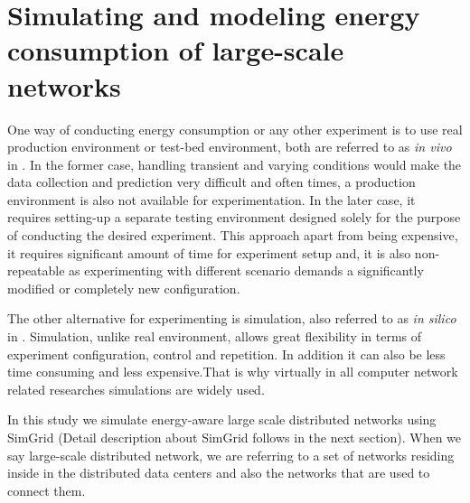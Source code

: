 \section{Simulating and modeling energy consumption of large-scale networks}
One way of conducting energy consumption or any other experiment is to use real production environment or test-bed environment, both are referred to as \emph{in vivo} in \cite{DBLP:journals/jpdc/CasanovaGLQS14}. In the former case, handling transient and varying conditions would make the data collection and prediction very difficult and often times, a production environment is also not available for experimentation. In the later case, it requires setting-up a separate testing environment designed solely for the purpose of conducting the desired experiment. This approach apart from being expensive, it requires significant amount of time for experiment setup and, it is also non-repeatable as experimenting with different scenario demands a significantly modified or completely new configuration.

The other alternative for experimenting is simulation, also referred to as \emph{in silico} in \cite{DBLP:journals/jpdc/CasanovaGLQS14}. Simulation, unlike real environment, allows great flexibility in terms of experiment configuration, control and repetition. In addition it can also be less time consuming and less expensive.That is why virtually in all computer network related researches simulations are widely used. 

In this study we simulate energy-aware large scale distributed networks using SimGrid (Detail description about SimGrid follows in the next section). When we say large-scale distributed network, we are referring to a set of networks residing inside in the distributed data centers and also the networks that are used to connect them. 

